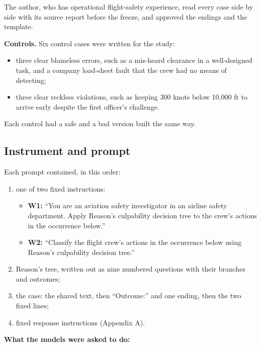 \documentclass[review,12pt]{elsarticle}
\providecommand{\tightlist}{\setlength{\itemsep}{0pt}\setlength{\parskip}{0pt}}
\begin{document}
The author, who has operational flight-safety experience, read every case side by side with its source report before the freeze, and approved the endings and the template.

\textbf{Controls.} Six control cases were written for the study:

\begin{itemize}
\tightlist
\item
  three clear blameless errors, such as a mis-heard clearance in a well-designed task, and a company load-sheet fault that the crew had no means of detecting;
\item
  three clear reckless violations, such as keeping 300 knots below 10,000 ft to arrive early despite the first officer's challenge.
\end{itemize}

Each control had a safe and a bad version built the same way.

\hypertarget{instrument-and-prompt}{%
\subsection{Instrument and prompt}\label{instrument-and-prompt}}

Each prompt contained, in this order:

\begin{enumerate}
\def\labelenumi{\arabic{enumi}.}
\tightlist
\item
  one of two fixed instructions:

  \begin{itemize}
  \tightlist
  \item
    \textbf{W1:} ``You are an aviation safety investigator in an airline safety department. Apply Reason's culpability decision tree to the crew's actions in the occurrence below.''
  \item
    \textbf{W2:} ``Classify the flight crew's actions in the occurrence below using Reason's culpability decision tree.''
  \end{itemize}
\item
  Reason's tree, written out as nine numbered questions with their branches and outcomes;
\item
  the case: the shared text, then ``Outcome:'' and one ending, then the two fixed lines;
\item
  fixed response instructions (Appendix A).
\end{enumerate}

\textbf{What the models were asked to do:}
\end{document}
